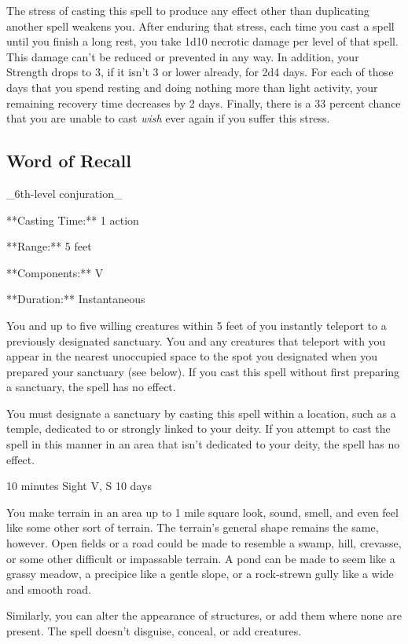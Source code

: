 The stress of casting this spell to produce any effect other than duplicating another spell weakens you. After enduring that stress, each time you cast a spell until you finish a long rest, you take 1d10 necrotic damage per level of that spell. This damage can’t be reduced or prevented in any way. In addition, your Strength drops to 3, if it isn’t 3 or lower already, for 2d4 days. For each of those days that you spend resting and doing nothing more than light activity, your remaining recovery time decreases by 2 days. Finally, there is a 33 percent chance that you are unable to cast \textit{wish} ever again if you suffer this stress.

\subsection{Word of Recall}

_6th-level conjuration_

**Casting Time:** 1 action

**Range:** 5 feet

**Components:** V

**Duration:** Instantaneous

You and up to five willing creatures within 5 feet of you instantly teleport to a previously designated sanctuary. You and any creatures that teleport with you appear in the nearest unoccupied space to the spot you designated when you prepared your sanctuary (see below). If you cast this spell without first preparing a sanctuary, the spell has no effect.

You must designate a sanctuary by casting this spell within a location, such as a temple, dedicated to or strongly linked to your deity. If you attempt to cast the spell in this manner in an area that isn’t dedicated to your deity, the spell has no effect.

{}
{10 minutes}
{Sight}
{V, S}
{10 days}

You make terrain in an area up to 1 mile square look, sound, smell, and even feel like some other sort of terrain. The terrain's general shape remains the same, however. Open fields or a road could be made to resemble a swamp, hill, crevasse, or some other difficult or impassable terrain. A pond can be made to seem like a grassy meadow, a precipice like a gentle slope, or a rock-strewn gully like a wide and smooth road.

Similarly, you can alter the appearance of structures, or add them where none are present. The spell doesn't disguise, conceal, or add creatures.

